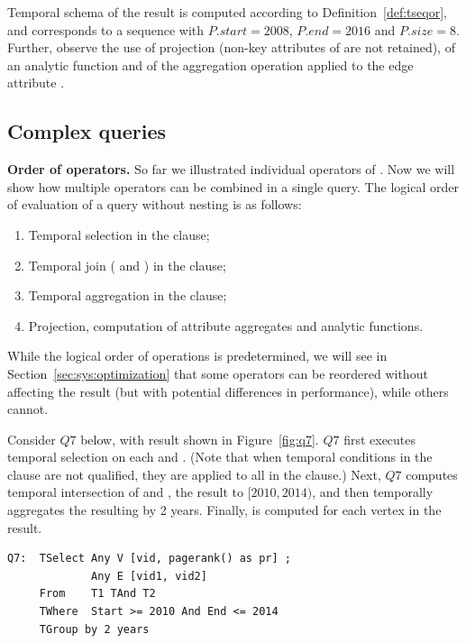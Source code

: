 Temporal schema of the result is computed according to
Definition~\ref{def:tseqor}, and corresponds to a sequence with
$P.start = 2008$, $P.end=2016$ and $P.size=8$.  Further, observe the
use of projection (non-key attributes of  are not retained),
of an analytic function  and of the aggregation
operation  applied to the edge attribute .

\subsection{Complex queries}
\label{sec:example:complex}

{\bf Order of operators.} So far we illustrated individual operators
of \ql.  Now we will show how multiple operators can be combined in a
single query.  The logical order of evaluation of a \ql query without
nesting is as follows:

\begin{enumerate}
\item Temporal selection in the  clause;
\item Temporal join ( and ) in the 
  clause;
\item Temporal aggregation in the  clause;
\item Projection, computation of attribute aggregates and analytic
  functions.
\end{enumerate}

While the logical order of operations is predetermined, we will see in
Section~\ref{sec:sys:optimization} that some operators can be
reordered without affecting the result (but with potential differences
in performance), while others cannot.  

Consider $Q7$ below, with result shown in Figure~\ref{fig:q7}. $Q7$
first executes temporal selection on each  and .
(Note that when temporal conditions in the  clause are
not qualified, they are applied to all \tgs in the 
clause.)  Next, $Q7$ computes temporal intersection of  and
, the result to $[2010, 2014)$, and then temporally
  aggregates the resulting \tg by 2 years.  Finally,
   is computed for each vertex in the result.

\begin{small}
\begin{verbatim}
Q7:  TSelect Any V [vid, pagerank() as pr] ; 
             Any E [vid1, vid2] 
     From    T1 TAnd T2 
     TWhere  Start >= 2010 And End <= 2014 
     TGroup by 2 years
\end{verbatim}
\end{small}

